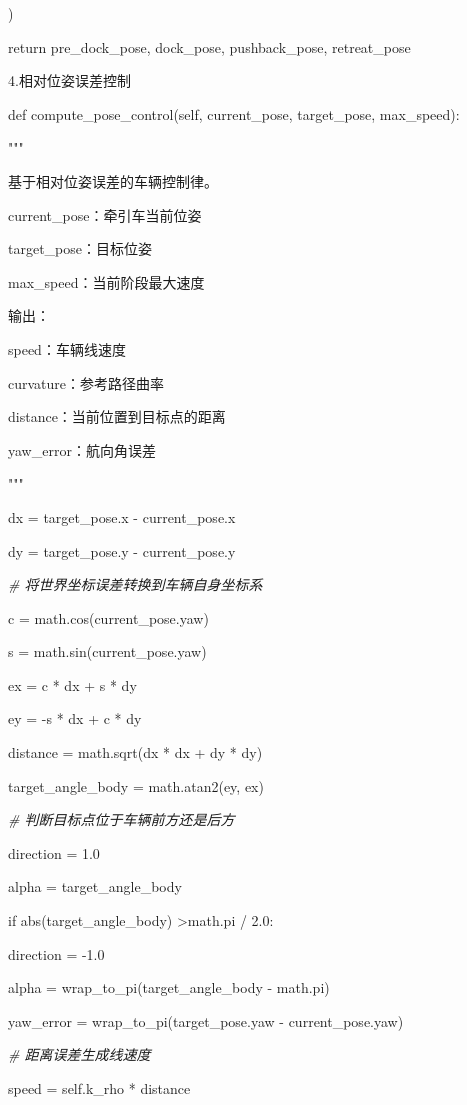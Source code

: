         )

        return pre\_dock\_pose, dock\_pose, pushback\_pose, retreat\_pose

4.相对位姿误差控制

  def compute\_pose\_control(self, current\_pose, target\_pose, max\_speed):

        """

        基于相对位姿误差的车辆控制律。

        current\_pose：牵引车当前位姿

        target\_pose：目标位姿

        max\_speed：当前阶段最大速度

        输出：

        speed：车辆线速度

        curvature：参考路径曲率

        distance：当前位置到目标点的距离

        yaw\_error：航向角误差

        """

        dx = target\_pose.x - current\_pose.x

        dy = target\_pose.y - current\_pose.y

        \emph{\# 将世界坐标误差转换到车辆自身坐标系}

        c = math.cos(current\_pose.yaw)

        s = math.sin(current\_pose.yaw)

        ex = c * dx + s * dy

        ey = -s * dx + c * dy

        distance = math.sqrt(dx * dx + dy * dy)

        target\_angle\_body = math.atan2(ey, ex)

        \emph{\# 判断目标点位于车辆前方还是后方}

        direction = 1.0

        alpha = target\_angle\_body

        if abs(target\_angle\_body) \textgreater math.pi / 2.0:

            direction = -1.0

            alpha = wrap\_to\_pi(target\_angle\_body - math.pi)

        yaw\_error = wrap\_to\_pi(target\_pose.yaw - current\_pose.yaw)

        \emph{\# 距离误差生成线速度}

        speed = self.k\_rho * distance

